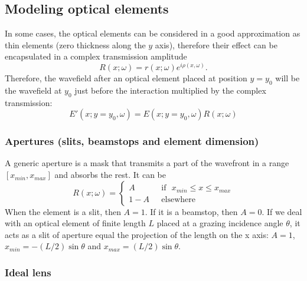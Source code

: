 \documentclass{iucr}              %
\begin{document}
\subsection{Modeling optical elements}
\label{sec:elements}

In some cases, the optical elements can be considered in a good approximation as thin elements (zero thickness along the $y$ axis), therefore their effect can be encapsulated in a complex transmission amplitude 
\begin{equation}
    \label{eq:thinelement}
    R(x;\omega)=r(x;\omega) e^{i \rho(x,\omega)}.
\end{equation}
Therefore, the wavefield after an optical element placed at position $y=y_0$ will be the wavefield at $y_0$ just before the interaction multiplied by the complex transmission:
\begin{equation}
    E'(x;y=y_0,\omega) = E(x;y=y_0,\omega) R(x;\omega)
\end{equation}


\subsubsection{Apertures (slits, beamstops and element dimension)}
\label{sec:aperture}

A generic aperture is a mask that transmits a part of the wavefront in a range $[x_{min},x_{max}]$ and absorbs the rest. It can be
\begin{equation}
R(x;\omega) =
\left\{
\begin{matrix}
A  & \mbox{~~if~~} x_{min} \le x \le x_{max}
\\ 
1 - A & \mbox{~~elsewhere}
\end{matrix}
\right.
\end{equation}
When the element is a slit, then $A=1$. If it is a beamstop, then $A=0$. If we deal with an optical element of finite length $L$ placed at a grazing incidence angle $\theta$, it acts as a slit of aperture equal the projection of the length on the x axis: $A=1$, $x_{min}=-(L/2) \sin \theta$ and $x_{max}=(L/2) \sin \theta$. 

\subsubsection{Ideal lens}
\label{sec:idealLens}
\end{document}

